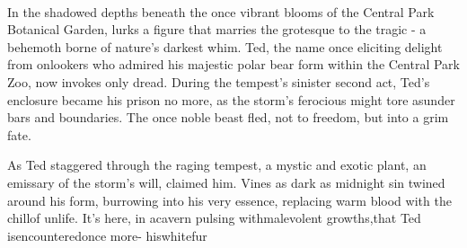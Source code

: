 \vspace*{4.75cm}\hfill\\
In the shadowed depths beneath the once vibrant blooms of the Central Park Botanical Garden, lurks a figure that marries the grotesque to the tragic - a behemoth borne of nature's darkest whim. Ted, the name once eliciting delight from onlookers who admired his majestic polar bear form within the Central Park Zoo, now invokes only dread. During the tempest's sinister second act, Ted's enclosure became his prison no more, as the storm's ferocious might tore asunder bars and boundaries. The once noble beast fled, not to freedom, but into a grim fate.

As Ted staggered through the raging tempest, a mystic and exotic plant, an emissary of the storm's will, claimed him. Vines as dark as midnight sin twined around his form, burrowing into his very essence, replacing warm blood with the chill\hspace*{4cm}of unlife. It's here, in a\linebreak\hspace*{5.25cm}cavern pulsing with\linebreak\hspace*{6.15cm}malevolent growths,\linebreak\hspace*{6.75cm}that Ted is\linebreak\hspace*{7.3cm}encountered\linebreak\hspace*{7.6cm}once more\linebreak\hspace*{8.25cm}- his\linebreak\hspace*{8.3cm}white\linebreak\hspace*{8.65cm}fur
\vfill\eject

